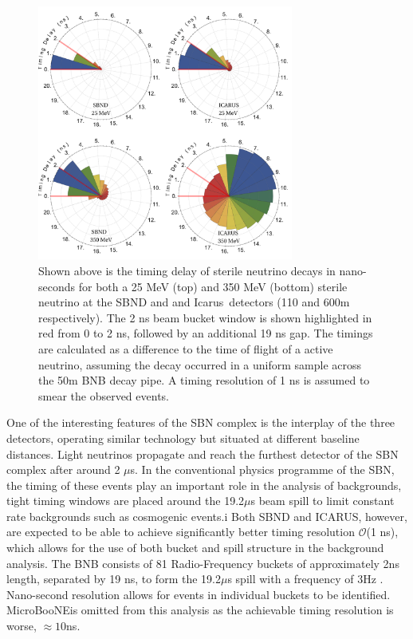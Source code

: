 \documentclass[11pt, a4paper]{article}
\def\muboone{MicroBooNE}
\def\icarus{Icarus}
\begin{document}
\begin{figure}[t]
%
\center
%
\includegraphics[width=0.75\textwidth]{figures/timing.pdf}
%
\caption{\label{fig:timing} Shown above is the timing delay of sterile neutrino
decays in nano-seconds for both a 25 MeV (top) and 350 MeV (bottom) sterile
neutrino at the SBND and and \icarus\ detectors (110 and 600m
respectively). The 2 ns beam bucket window is shown highlighted in red from 0
to 2 ns, followed by an additional 19 ns gap. The timings are calculated as a
difference to the time of flight of a active neutrino, assuming the decay
occurred in a uniform sample across the 50m BNB decay pipe. A timing resolution
of 1 ns is assumed to smear the observed events. }
%
\end{figure}

One of the interesting features of the SBN complex is the interplay of the
three detectors, operating similar technology but situated at different
baseline distances. Light neutrinos propagate and reach the furthest detector of the SBN complex after around 2
$\mu$s. In the conventional physics programme of the SBN, the timing of these events play an important
role in the analysis of backgrounds, tight timing windows are placed around the
19.2$\mu$s beam spill to limit constant rate backgrounds such as cosmogenic events.i 
Both SBND and ICARUS, however, are expected to be able to achieve significantly better timing resolution $\mathcal{O}$(1 ns), which allows for the use of both bucket and spill structure in the background analysis. The
BNB consists of 81 Radio-Frequency buckets of approximately 2ns length,
separated by 19 ns, to form the 19.2$\mu$s spill with a frequency of 3Hz
\cite{Antonello:2015ea}. Nano-second resolution allows for events in individual buckets to be identified. \muboone is omitted from this analysis as the achievable timing resolution is worse, $\approx 10$ns.
\end{document}
